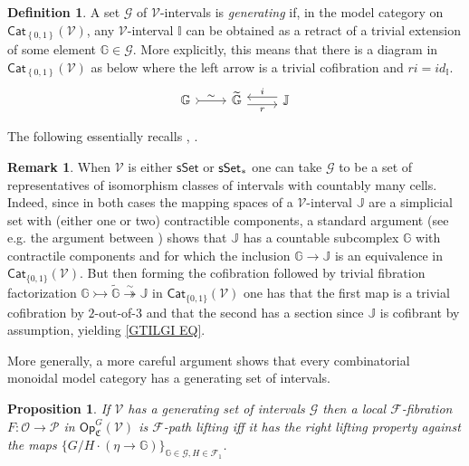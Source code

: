 \documentclass[a4paper,10pt
,draft
]{article}%
\numberwithin{equation}{section}
\numberwithin{figure}{section}
\newtheorem{proposition}[equation]{Proposition}%
\theoremstyle{definition} %
\newtheorem{definition}[equation]{Definition}%
\newtheorem{remark}[equation]{Remark}%
\newcommand{\set}[1]{\left\{#1\right\}}%
\newcommand{\Cat}{\mathsf{Cat}}
\newcommand{\F}{\ensuremath{\mathcal F}}
\newcommand{\V}{\ensuremath{\mathcal V}}
\renewcommand{\O}{\ensuremath{\mathcal O}}
\renewcommand{\P}{\ensuremath{\mathcal P}}
\newcommand{\1}{\ensuremath{\mathbbm 1}}%
\begin{document}
\begin{definition}\label{INTGENSET DEF}
	A set $\mathscr{G}$ of $\V$-intervals is \textit{generating} if,
	in the model category on $\Cat_{\set{0,1}}(\V)$,
	any $\V$-interval $\mathbb{I}$ can be obtained
	as a retract of a trivial extension of some element
	$\mathbb{G} \in \mathscr{G}$.
	More explicitly, this means that there is a diagram in 
	$\Cat_{\set{0,1}}(\V)$ as below
	where the left arrow is a trivial cofibration and
	$ri = id_{\mathbb{I}}$.
\begin{equation}\label{GTILGI EQ}
	\begin{tikzcd}
		\mathbb{G} \arrow[r,rightarrowtail, "\sim"]
	&
		\widetilde{\mathbb{G}} \arrow[r,yshift=-.3em, "r"']
	&
		\mathbb{J} \arrow[l,yshift=.3em, "i"']
	\end{tikzcd}
\end{equation}
\end{definition}


The following essentially recalls \cite[1.20]{CM13b}, \cite[\S 4.3]{Cav}.


\begin{remark}
      \label{SSETINT_REM}
When $\V$ is either $\mathsf{sSet}$ or $\mathsf{sSet}_{\**}$
one can take $\mathscr{G}$ to be a set of representatives of isomorphism classes of intervals with countably many cells.
Indeed, since in both cases the mapping spaces of a $\V$-interval
$\mathbb{J}$ are a simplicial set with (either one or two) contractible components,
a standard argument (see e.g. the argument between \cite[Lemmas 4.2,4.3]{Ber07b})
shows that $\mathbb{J}$ has a countable subcomplex $\mathbb{G}$ with contractile components and
for which the inclusion 
$\mathbb{G} \to \mathbb{J}$
is an equivalence in $\mathsf{Cat}_{\{0,1\}}(\V)$.
But then forming the cofibration followed by trivial fibration factorization
$\mathbb{G} \rightarrowtail \widetilde{\mathbb{G}}
\overset{\sim}{\twoheadrightarrow} \mathbb{J}$
in $\mathsf{Cat}_{\{0,1\}}(\V)$
one has that the first map is a trivial cofibration by $2$-out-of-$3$
and that the second has a section since $\mathbb{J}$ is cofibrant by assumption, yielding \eqref{GTILGI EQ}.

More generally, a more careful argument \cite[Lemma 1.12]{BM13}
shows that every combinatorial monoidal model category
has a generating set of intervals.
\end{remark}



\begin{proposition}\label{GENIN PROP}
If $\V$ has a generating set of intervals $\mathscr{G}$ then a local $\F$-fibration 
$F \colon \O \to \P$ in 
$\mathsf{Op}^G_{\mathfrak{C}}(\V)$
is $\F$-path lifting iff it has the right lifting property against the maps 
$\{G/H \cdot (\eta \to \mathbb{G})\}_{\mathbb{G}\in \mathscr{G},H \in \mathcal{F}_1}$.
\end{proposition}
\end{document}
